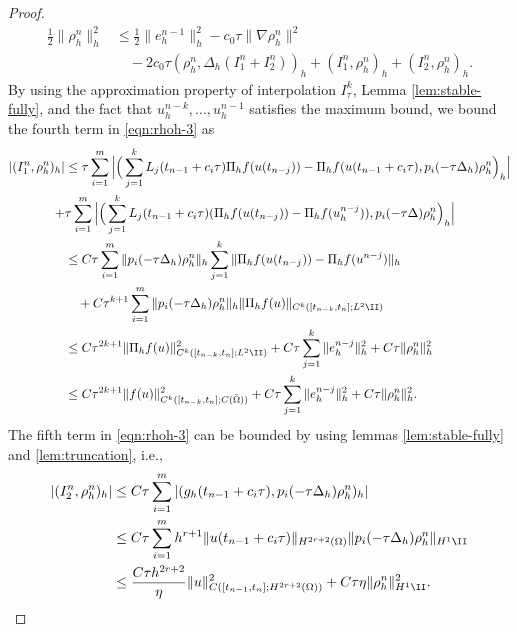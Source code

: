 \begin{proof}
\begin{equation}
\begin{aligned}
 \frac12 \| \rho_h^n \|_h^2 %
&\le \frac12\|  e_h^{n-1} \|_h^2 - c_0\tau \| \nabla \rho_h^n\|^2\\
&\quad- 2c_0\tau ( \rho_h^n,\Delta_h (I_1^n+I_2^n))_h + (I_1^n,\rho_h^n)_h + (I_2^n,\rho_h^n)_h.
\end{aligned}
\end{equation}
By using the approximation property of interpolation $I_\tau^k$, Lemma \ref{lem:stable-fully},
 and the fact that $u_h^{n-k},\dots,u_h^{n-1}$ satisfies the maximum bound,
we bound the fourth term in \eqref{eqn:rhoh-3}  as
\begin{align*}
 | (I_1^n,\rho_h^n)_h |  &\le   \tau \sum_{i=1}^m \Big|\Big( \sum_{j=1}^k L_j(t_{n-1} + c_i\tau) \Pi_hf(u(t_{n-j}))- \Pi_h f(u(t_{n-1} + c_i\tau), p_i(-\tau \Delta_h)\rho_h^n\Big)_h\Big|   \\
 +&  \tau \sum_{i=1}^m \Big| \Big( \sum_{j=1}^k L_j(t_{n-1} + c_i\tau) (\Pi_h f(u(t_{n-j}))-\Pi_hf(u_h^{n-j})), p_i(-\tau \Delta)\rho_h^n\Big)_h \Big| \\
   &\le  C \tau \sum_{i=1}^m \|p_i(-\tau \Delta_h)\rho_h^n \|_h  \sum_{j=1}^k  \|\Pi_hf(u(t_{n-j}))- \Pi_h f(u^{n-j})\|_h   \\
     &\quad+  C \tau^{k+1} \sum_{i=1}^m  \|p_i(-\tau \Delta_h)\rho_h^n \|_h  \|  \Pi_h f(u)  \|_{C^{k}([t_{n-k},t_n]; L^2\II)} \\
 &\le C\tau^{2k+1} \|  \Pi_h f(u)  \|_{C^{k}([t_{n-k},t_n]; L^2\II)}^2 + C \tau \sum_{j=1}^k \|  e_h^{n-j}  \|_h^2 +  C\tau \|  \rho_h^n \|_h^2 \\
  &\le C\tau^{2k+1} \|  f(u)  \|_{C^{k}([t_{n-k},t_n]; C(\bar\Omega))}^2 + C \tau \sum_{j=1}^k \|  e_h^{n-j}  \|_h^2 +  C\tau \|  \rho_h^n \|_h^2.
\end{align*}
The fifth term in \eqref{eqn:rhoh-3} can be bounded by using lemmas \ref{lem:stable-fully} and \ref{lem:truncation}, i.e.,
\begin{equation}\label{eqn:fully-I2}
\begin{split}
| (I_2^n,\rho_h^n)_h | &\le C \tau \sum_{i=1}^m |(g_h(t_{n-1}+c_i\tau), p_i(-\tau\Delta_h)\rho_h^n)_h| \\
&\le C\tau \sum_{i=1}^m h^{r+1} \| u(t_{n-1}+c_i\tau)  \|_{H^{2r+2}(\Omega)} \| p_i(-\tau\Delta_h) \rho_h^n \|_{H^1\II} \\
&\le \frac{C \tau h^{2r+2}}{\eta}  \| u  \|_{C([t_{n-1},t_n];H^{2r+2}(\Omega))}^2 + C\tau \eta  \| \rho_h^n \|_{H^1\II}^2.

\end{split}
\end{equation}
\end{proof}
